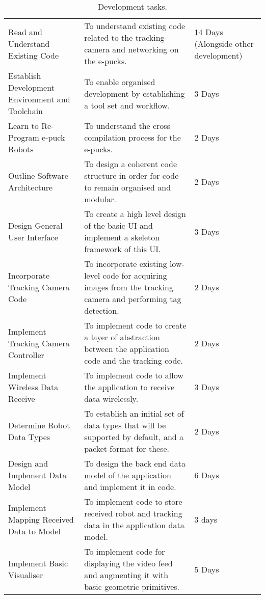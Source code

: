 \begin{table}
	\caption{Development tasks.}
	\label{tab:DevTasks}
	\centering
	\begin{tabular}[H]{ >{\raggedright}p{5cm}>{\raggedright}p{7cm}p{3cm} }
		\toprule
		\tabhead{Task} & \tabhead{Objective} & \tabhead{Approximate Time} \\
		\midrule
  Read and Understand Existing Code 				& To understand existing code related to the tracking camera and networking on the e-pucks. 							& 14 Days (Alongside other development)\\
  Establish Development Environment and Toolchain 	& To enable organised development by establishing a tool set and workflow. 												& 3 Days \\
  Learn to Re-Program e-puck Robots 				& To understand the cross compilation process for the e-pucks. 															& 2 Days \\ 
  Outline Software Architecture 					& To design a coherent code structure in order for code to remain organised and modular. 								& 2 Days \\
  Design General User Interface 					& To create a high level design of the basic UI and implement a skeleton framework of this UI.							& 3 Days \\ 
  Incorporate Tracking Camera Code 					& To incorporate existing low-level code for acquiring images from the tracking camera and performing tag detection. 	& 2 Days \\
  Implement Tracking Camera Controller 				& To implement code to create a layer of abstraction between the application code and the tracking code. 				& 2 Days \\
  Implement Wireless Data Receive 					& To implement code to allow the application to receive data wirelessly. 												& 3 Days \\
  Determine Robot Data Types 						& To establish an initial set of data types that will be supported by default, and a packet format for these. 			& 2 Days \\
  Design and Implement Data Model 					& To design the back end data model of the application and implement it in code.										& 6 Days \\
  Implement Mapping Received Data to Model 			& To implement code to store received robot and tracking data in the application data model. 							& 3 days \\
  Implement Basic Visualiser 						& To implement code for displaying the video feed and augmenting it with basic geometric primitives. 					& 5 Days \\

\end{tabular}
\end{table}
